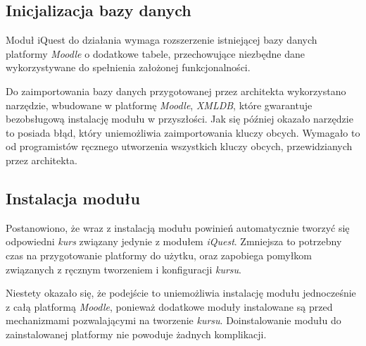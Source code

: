 
\subsection{Inicjalizacja bazy danych}
Moduł iQuest do działania wymaga rozszerzenie istniejącej bazy danych platformy \emph{Moodle} o dodatkowe tabele, przechowujące niezbędne dane wykorzystywane do spełnienia założonej funkcjonalności.

Do zaimportowania bazy danych przygotowanej przez architekta wykorzystano narzędzie, wbudowane w platformę \emph{Moodle}, \emph{XMLDB}, które gwarantuje bezobsługową instalację modułu w przyszłości. Jak się później okazało narzędzie to posiada błąd, który uniemożliwia zaimportowania kluczy obcych. Wymagało to od programistów ręcznego utworzenia wszystkich kluczy obcych, przewidzianych przez architekta.

\subsection{Instalacja modułu}
Postanowiono, że wraz z instalacją modułu powinień automatycznie tworzyć się odpowiedni \emph{kurs} związany jedynie z modułem \emph{iQuest}. Zmniejsza to potrzebny czas na przygotowanie platformy do użytku, oraz zapobiega pomyłkom związanych z ręcznym tworzeniem i konfiguracji \emph{kursu}. 

Niestety okazało się, że podejście to uniemożliwia instalację modułu jednocześnie z całą platformą \emph{Moodle}, ponieważ dodatkowe moduły instalowane są przed mechanizmami pozwalającymi na tworzenie \emph{kursu}. Doinstalowanie modułu do zainstalowanej platformy nie powoduje żadnych komplikacji.
